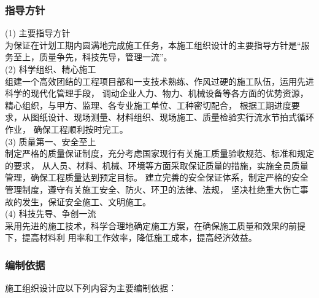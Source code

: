 \subsubsection{指导方针}

(1) 主要指导方针\\

为保证在计划工期内圆满地完成施工任务，本施工组织设计的主要指导方针是“服务至上，质量争先，科技先导，管理一流”。\\

(2) 科学组织、精心施工\\

组建一个高效团结的工程项目部和一支技术熟练、作风过硬的施工队伍，运用先进科学的现代化管理手段，
调动企业人力、物力、机械设备等各方面的优势资源，精心组织，与甲方、监理、各专业施工单位、工种密切配合，
根据工期进度要求，从图纸设计、现场测量、材料组织、现场施工、质量检验实行流水节拍式循环作业，
确保工程顺利按时完工。\\

(3) 质量第一、安全至上\\

制定严格的质量保证制度，充分考虑国家现行有关施工质量验收规范、标准和规定的要求，
从人员、材料、机械、环境等方面采取保证质量的措施，实施全员质量管理，确保工程质量达到预定目标。
建立完善的安全保证体系，制定严格的安全管理制度，遵守有关施工安全、防火、环卫的法律、法规，
坚决杜绝重大伤亡事故的发生，保证安全施工、文明施工。\\

(4) 科技先导、争创一流\\

采用先进的施工技术，科学合理地确定施工方案，在确保施工质量和效果的前提下，提高材料利
用率和工作效率，降低施工成本，提高经济效益。

\subsubsection{编制依据}

施工组织设计应以下列内容为主要编制依据：

